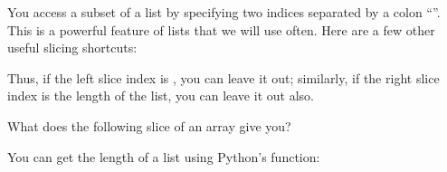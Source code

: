\documentclass[letterpaper,10pt,english]{sphinxmanual}
\begin{document}
\sphinxAtStartPar
You access a subset of a list by specifying two indices separated by a colon “\sphinxcode{\sphinxupquote{:}}”.  This is a powerful feature of lists that we will use often.  Here are a few other useful slicing shortcuts:

\begin{sphinxVerbatim}[commandchars=\\\{\},numbers=left,firstnumber=1,stepnumber=1]
\PYG{p}{[}\PYG{p}{]}
\PYG{p}{[}  \PYG{p}{]}

\PYG{p}{[}\PYG{p}{]}
\PYG{p}{[}  \PYG{p}{]}

\PYG{p}{[}\PYG{p}{]}
\PYG{p}{[}    \PYG{p}{]}
\end{sphinxVerbatim}

\sphinxAtStartPar
Thus, if the left slice index is , you can leave it out; similarly, if the right slice index is the length of the list, you can leave it out also.

\sphinxAtStartPar
What does the following slice of an array give you?

\begin{sphinxVerbatim}[commandchars=\\\{\}]
\PYG{p}{[}\PYG{p}{]}
\end{sphinxVerbatim}

\sphinxAtStartPar
You can get the length of a list using Python’s  function:

\begin{sphinxVerbatim}[commandchars=\\\{\}]
\end{sphinxVerbatim}
\end{document}
